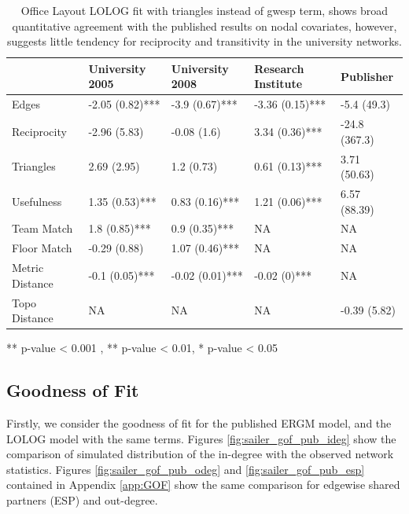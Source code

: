 \documentclass[
]{statsoc}
\begin{document}
\begin{table}

\caption{\label{tab:unnamed-chunk-5}\label{tab:sailer_lolog_tri} Office Layout LOLOG fit with triangles instead of gwesp term, shows broad quantitative agreement with the published results on nodal covariates, however, suggests little tendency for reciprocity and transitivity in the university networks.}
\centering
\begin{threeparttable}
\begin{tabular}[t]{lllll}
\toprule
  & University 2005 & University 2008 & Research Institute & Publisher\\
\midrule
\rowcolor{gray!6}  Edges & -2.05 (0.82)*** & -3.9 (0.67)*** & -3.36 (0.15)*** & -5.4 (49.3)\\
Reciprocity & -2.96 (5.83) & -0.08 (1.6) & 3.34 (0.36)*** & -24.8 (367.3)\\
\rowcolor{gray!6}  Triangles & 2.69 (2.95) & 1.2 (0.73) & 0.61 (0.13)*** & 3.71 (50.63)\\
Usefulness & 1.35 (0.53)*** & 0.83 (0.16)*** & 1.21 (0.06)*** & 6.57 (88.39)\\
\rowcolor{gray!6}  Team Match & 1.8 (0.85)*** & 0.9 (0.35)*** & NA & NA\\
\addlinespace
Floor Match & -0.29 (0.88) & 1.07 (0.46)*** & NA & NA\\
\rowcolor{gray!6}  Metric Distance & -0.1 (0.05)*** & -0.02 (0.01)*** & -0.02 (0)*** & NA\\
Topo Distance & NA & NA & NA & -0.39 (5.82)\\
\bottomrule
\end{tabular}
\begin{tablenotes}
\item *** p-value < 0.001 , ** p-value < 0.01, * p-value < 0.05
\end{tablenotes}
\end{threeparttable}
\end{table}

\subsection{Goodness of Fit}

Firstly, we consider the goodness of fit for the published ERGM model,
and the LOLOG model with the same terms. Figures
\ref{fig:sailer_gof_pub_ideg} show the comparison of simulated
distribution of the in-degree with the observed network statistics.
Figures \ref{fig:sailer_gof_pub_odeg} and \ref{fig:sailer_gof_pub_esp}
contained in Appendix \ref{app:GOF} show the same comparison for
edgewise shared partners (ESP) and out-degree.
\end{document}
